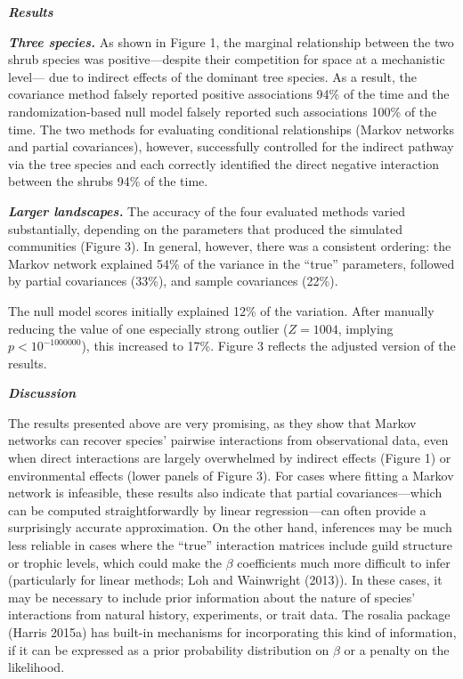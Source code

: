 \documentclass[12pt,]{article}
\begin{document}
\begin{spacing}{1.9}
\begin{flushleft}
\textbf{\emph{Results}}

\textbf{\emph{Three species.}} As shown in Figure 1, the marginal
relationship between the two shrub species was positive---despite their
competition for space at a mechanistic level--- due to indirect effects
of the dominant tree species. As a result, the covariance method falsely
reported positive associations 94\% of the time and the
randomization-based null model falsely reported such associations 100\%
of the time. The two methods for evaluating conditional relationships
(Markov networks and partial covariances), however, successfully
controlled for the indirect pathway via the tree species and each
correctly identified the direct negative interaction between the shrubs
94\% of the time.

\textbf{\emph{Larger landscapes.}} The accuracy of the four evaluated
methods varied substantially, depending on the parameters that produced
the simulated communities (Figure 3). In general, however, there was a
consistent ordering: the Markov network explained 54\% of the variance
in the ``true'' parameters, followed by partial covariances (33\%), and
sample covariances (22\%).

The null model scores initially explained 12\% of the variation. After
manually reducing the value of one especially strong outlier
(\(Z=1004\), implying \(p<10^{-1000000}\)), this increased to 17\%.
Figure 3 reflects the adjusted version of the results.

\textbf{\emph{Discussion}}

The results presented above are very promising, as they show that Markov
networks can recover species' pairwise interactions from observational
data, even when direct interactions are largely overwhelmed by indirect
effects (Figure 1) or environmental effects (lower panels of Figure 3).
For cases where fitting a Markov network is infeasible, these results
also indicate that partial covariances---which can be computed
straightforwardly by linear regression---can often provide a
surprisingly accurate approximation. On the other hand, inferences may
be much less reliable in cases where the ``true'' interaction matrices
include guild structure or trophic levels, which could make the
\(\beta\) coefficients much more difficult to infer (particularly for
linear methods; Loh and Wainwright (2013)). In these cases, it may be
necessary to include prior information about the nature of species'
interactions from natural history, experiments, or trait data. The
rosalia package (Harris 2015a) has built-in mechanisms for incorporating
this kind of information, if it can be expressed as a prior probability
distribution on \(\beta\) or a penalty on the likelihood.


\end{flushleft}
\end{spacing}
\end{document}
